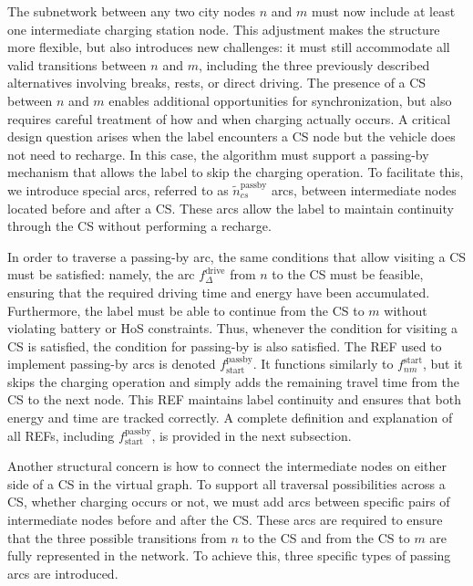 \documentclass[trsc,dblanonrev]{informs4}
\begin{document}
The subnetwork between any two city nodes \( n \) and \( m \) must now include at least one intermediate charging station node. This adjustment makes the structure more flexible, but also introduces new challenges: it must still accommodate all valid transitions between \( n \) and \( m \), including the three previously described alternatives involving breaks, rests, or direct driving. The presence of a CS between \( n \) and \( m \) enables additional opportunities for synchronization, but also requires careful treatment of how and when charging actually occurs. A critical design question arises when the label encounters a CS node but the vehicle does not need to recharge. In this case, the algorithm must support a passing-by mechanism that allows the label to skip the charging operation. To facilitate this, we introduce special arcs, referred to as \( \tilde{n}^{\text{passby}}_{cs} \) arcs, between intermediate nodes located before and after a CS. These arcs allow the label to maintain continuity through the CS without performing a recharge.

In order to traverse a passing-by arc, the same conditions that allow visiting a CS must be satisfied: namely, the arc \( f^{\text{drive}}_{\Delta} \) from \( n \) to the CS must be feasible, ensuring that the required driving time and energy have been accumulated. Furthermore, the label must be able to continue from the CS to \( m \) without violating battery or HoS constraints. Thus, whenever the condition for visiting a CS is satisfied, the condition for passing-by is also satisfied. The REF used to implement passing-by arcs is denoted \( f^{\text{passby}}_{\text{start}} \). It functions similarly to \( f^{\text{start}}_{nm} \), but it skips the charging operation and simply adds the remaining travel time from the CS to the next node. This REF maintains label continuity and ensures that both energy and time are tracked correctly. A complete definition and explanation of all REFs, including \( f^{\text{passby}}_{\text{start}} \), is provided in the next subsection.

Another structural concern is how to connect the intermediate nodes on either side of a CS in the virtual graph. To support all traversal possibilities across a CS, whether charging occurs or not, we must add arcs between specific pairs of intermediate nodes before and after the CS. These arcs are required to ensure that the three possible transitions from \( n \) to the CS and from the CS to \( m \) are fully represented in the network. To achieve this, three specific types of passing arcs are introduced.
\end{document}
